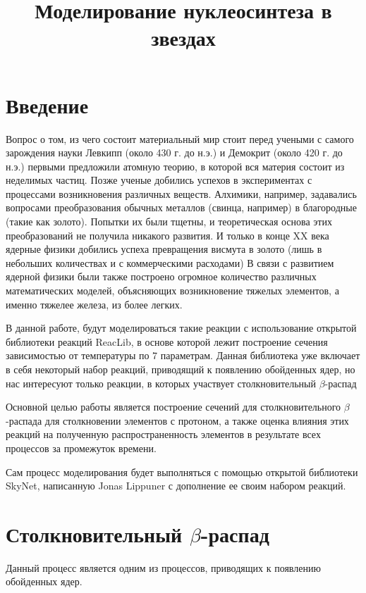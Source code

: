 \documentclass[%
master,    %
natbib,      %
subf,        %
href,        %
colorlinks,  %
]{disser}
\begin{document}
\title{Моделирование нуклеосинтеза в звездах}
\maketitle
\section*{\centering Введение}
Вопрос о том, из чего состоит материальный мир стоит перед учеными с самого зарождения науки Левкипп (около 430 г. до н.э.) и Демокрит (около 420 г. до н.э.) первыми предложили атомную теорию, в которой вся материя состоит из неделимых частиц. Позже ученые добились успехов в экспериментах с процессами возникновения различных веществ. Алхимики, например, задавались вопросами преобразования обычных металлов (свинца, например) в благородные (такие как золото). Попытки их были тщетны, и теоретическая основа этих преобразований не получила никакого развития. И только в конце XX века ядерные физики добились успеха превращения висмута в золото (лишь в небольших количествах и с коммерческими расходами)
В связи с развитием ядерной физики были также построено огромное количество различных математических моделей, объясняющих возникновение тяжелых элементов, а именно тяжелее железа, из более легких.

В данной работе, будут моделироваться такие реакции с использование открытой библиотеки реакций ReacLib, в основе которой лежит построение сечения зависимостью от температуры по 7 параметрам. Данная библиотека уже включает в себя некоторый набор реакций, приводящий к появлению обойденных ядер, но нас интересуют только реакции, в которых участвует столкновительный $\beta$-распад

Основной целью работы является построение сечений для столкновительного $\beta$-распада для столкновении элементов с протоном, а также оценка влияния этих реакций на полученную распространенность элементов в результате всех процессов за промежуток времени.

Сам процесс моделирования будет выполняться с помощью открытой библиотеки SkyNet, написанную Jonas Lippuner с дополнение ее своим набором реакций.

\section{Столкновительный $\beta$-распад}
Данный процесс является одним из процессов, приводящих к появлению обойденных ядер.
\end{document}
